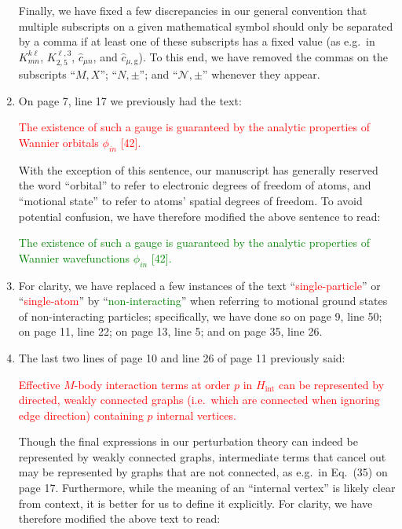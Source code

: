 \documentclass[preprint,showkeys,nofootinbib]{revtex4-1}
\renewcommand{\t}{\text} %
\newcommand{\g}{\text{g}}
\renewcommand{\c}{\hat{c}}
\newcommand{\N}{\mathcal{N}}
\newcommand{\1}{\mathds{1}}
\newcommand{\red}[1]{\textcolor{red}{#1}}
\newcommand{\green}[1]{\textcolor{green}{#1}}
\begin{document}
\begin{enumerate}[label=(R3.\arabic*)]
  Finally, we have fixed a few discrepancies in our general convention
  that multiple subscripts on a given mathematical symbol should only
  be separated by a comma if at least one of these subscripts has a
  fixed value (as e.g.~in $K^{k\ell}_{mn}$, $K^{\ell,3}_{2,5}$,
  $\c_{\mu n}$, and $\c_{\mu,\g}$).  To this end, we have removed the
  commas on the subscripts ``$M,X$''; ``$N,\pm$''; and ``$\N,\pm$''
  whenever they appear.


\item On page 7, line 17 we previously had the text:

  \red{The existence of such a gauge is guaranteed by the analytic
    properties of Wannier orbitals $\phi_{in}$ [42].}

  With the exception of this sentence, our manuscript has generally
  reserved the word ``orbital'' to refer to electronic degrees of
  freedom of atoms, and ``motional state'' to refer to atoms' spatial
  degrees of freedom.  To avoid potential confusion, we have therefore
  modified the above sentence to read:

  \green{The existence of such a gauge is guaranteed by the analytic
    properties of Wannier wavefunctions $\phi_{in}$ [42].}


\item For clarity, we have replaced a few instances of the text
  ``\red{single-particle}'' or ``\red{single-atom}'' by
  ``\green{non-interacting}'' when referring to motional ground states
  of non-interacting particles; specifically, we have done so on page
  9, line 50; on page 11, line 22; on page 13, line 5; and on page 35,
  line 26.


\item The last two lines of page 10 and line 26 of page 11 previously
  said:

  \red{Effective $M$-body interaction terms at order $p$ in
    $H_{\t{int}}$ can be represented by directed, weakly connected
    graphs (i.e.~which are connected when ignoring edge direction)
    containing $p$ internal vertices.}

  Though the final expressions in our perturbation theory can indeed
  be represented by weakly connected graphs, intermediate terms that
  cancel out may be represented by graphs that are not connected, as
  e.g.~in Eq.~(35) on page 17.  Furthermore, while the meaning of an
  ``internal vertex'' is likely clear from context, it is better for
  us to define it explicitly.  For clarity, we have therefore modified
  the above text to read:


\end{enumerate}
\end{document}
